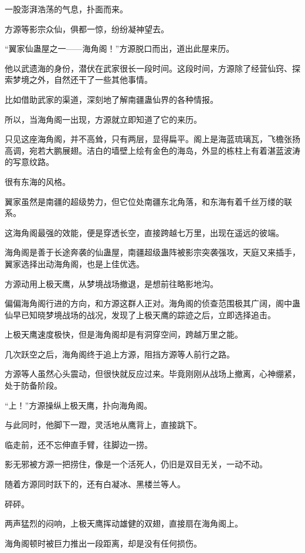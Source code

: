 
\begin{this_body}

一股澎湃浩荡的气息，扑面而来。

方源等影宗众仙，俱都一惊，纷纷凝神望去。

“翼家仙蛊屋之一——海角阁！”方源脱口而出，道出此屋来历。

他以武遗海的身份，潜伏在武家很长一段时间。这段时间，方源除了经营仙窍、探索梦境之外，自然还干了一些其他事情。

比如借助武家的渠道，深刻地了解南疆蛊仙界的各种情报。

所以，当海角阁一出现，方源就立即知道了它的来历。

只见这座海角阁，并不高耸，只有两层，显得扁平。阁上是海蓝琉璃瓦，飞檐张扬高调，宛若大鹏展翅。洁白的墙壁上绘有金色的海岛，外显的栋柱上有着湛蓝波涛的写意纹路。

很有东海的风格。

翼家虽然是南疆的超级势力，但它位处南疆东北角落，和东海有着千丝万缕的联系。

这海角阁最强的效能，便是穿透长空，直接跨越七万里，出现在遥远的彼端。

海角阁是善于长途奔袭的仙蛊屋，南疆超级蛊阵被影宗突袭强攻，天庭又来插手，翼家选择出动海角阁，也是上佳优选。

方源动用上极天鹰，从梦境战场撤退，是想前往略影地沟。

偏偏海角阁行进的方向，和方源这群人正对。海角阁的侦查范围极其广阔，阁中蛊仙早已知晓梦境战场的战况，发现了上极天鹰的踪迹之后，立即选择追击。

上极天鹰速度极快，但是海角阁却是有洞穿空间，跨越万里之能。

几次跃空之后，海角阁终于追上方源，阻挡方源等人前行之路。

方源等人虽然心头震动，但很快就反应过来。毕竟刚刚从战场上撤离，心神绷紧，处于防备阶段。

“上！”方源操纵上极天鹰，扑向海角阁。

与此同时，他脚下一蹬，灵活地从鹰背上，直接跳下。

临走前，还不忘伸直手臂，往脚边一捞。

影无邪被方源一把捞住，像是一个活死人，仍旧是双目无关，一动不动。

随着方源同时跃下的，还有白凝冰、黑楼兰等人。

砰砰。

两声猛烈的闷响，上极天鹰挥动雄健的双翅，直接扇在海角阁上。

海角阁顿时被巨力推出一段距离，却是没有任何损伤。


\end{this_body}
